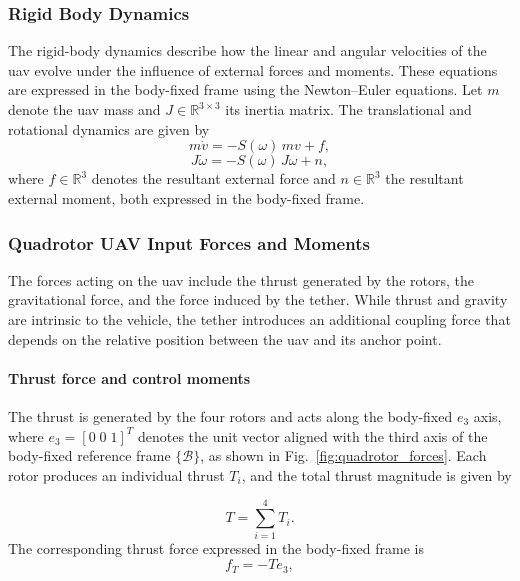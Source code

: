 \subsubsection{Rigid Body Dynamics}

The rigid-body dynamics describe how the linear and angular velocities of the \gls{uav} evolve under the influence of external forces and moments. These equations are expressed in the body-fixed frame using the Newton--Euler equations. Let \(m\) denote the \gls{uav} mass and \(J \in \mathbb{R}^{3 \times 3}\) its inertia matrix. The translational and rotational dynamics are given by
\begin{equation}
m \dot{v} = -S(\omega)\, m v + f,
\end{equation}
\begin{equation}
J \dot{\omega} = -S(\omega)\, J \omega + n,
\end{equation}
where \(f \in \mathbb{R}^3\) denotes the resultant external force and \(n \in \mathbb{R}^3\) the resultant external moment, both expressed in the body-fixed frame.

\subsubsection{Quadrotor UAV Input Forces and Moments}

The forces acting on the \gls{uav} include the thrust generated by the rotors, the gravitational force, and the force induced by the tether. While thrust and gravity are intrinsic to the vehicle, the tether introduces an additional coupling force that depends on the relative position between the \gls{uav} and its anchor point.

\paragraph{Thrust force and control moments}

The thrust is generated by the four rotors and acts along the body-fixed \(e_3\) axis, where \(e_3 = [0\;0\;1]^T\) denotes the unit vector aligned with the third axis of the body-fixed reference frame \(\{\mathcal{B}\}\), as shown in Fig.~\ref{fig:quadrotor_forces}. Each rotor produces an individual thrust \(T_i\), and the total thrust magnitude is given by

\begin{equation}
T = \sum_{i=1}^{4} T_i .
\end{equation}
The corresponding thrust force expressed in the body-fixed frame is
\begin{equation}
f_T = -T e_3 ,
\end{equation}

